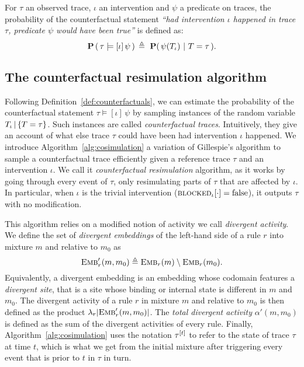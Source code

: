 \begin{definition}\label{def:counterfactuals}
  For $\tau$ an observed trace, $\iota$ an intervention and $\psi$ a
  predicate on traces, the probability of the counterfactual statement
  \textit{``had intervention $\iota$ happened in trace $\tau$,
    predicate $\psi$ would have been true''} is defined as:
  \[ \PCFST{} \eqdef \ \mathbf{P}(\, \psi(\ATRAJ{}) \ |\ T = \tau\,). \]
\end{definition}

\subsection{The counterfactual resimulation algorithm}
\label{subsec:cosim-algo}

Following Definition~\ref{def:counterfactuals}, we can estimate the
probability of the counterfactual statement
$\tau \models [\iota] \, \psi$ by sampling instances of the random
variable ${T_\iota\,|\,\{T=\tau\}}{}$. Such instances are called \emph{counterfactual
  traces}. Intuitively, they give an account of what else trace
$\tau$ could have been had intervention $\iota$ happened.  We
introduce Algorithm~\ref{alg:cosimulation} a variation of Gillespie's
algorithm to sample a counterfactual trace efficiently given a
reference trace $\tau$ and an intervention $\iota$.  We call it
\emph{counterfactual resimulation} algorithm, as it works by going
through every event of $\tau$, only resimulating parts of $\tau$ that are
affected by $\iota$. In particular, when $\iota$ is the trivial
intervention (${\textsc{blocked}}_{\iota}[\cdot] = \text{false}$), it outputs
$\tau$ with no modification.

This algorithm relies on a modified notion of activity we call
\emph{divergent activity}. We define the set of \emph{divergent
  embeddings} of the left-hand side of a rule $r$ into mixture $m$
and relative to $m_0$ as
\[{\textsc{Emb}}'_{r}(m, m_0) \triangleq {\textsc{Emb}}_{r}(m) \setminus {\textsc{Emb}}_{r}(m_0).\]
Equivalently, a divergent embedding is an embedding whose codomain
features a \emph{divergent site}, that is a site whose binding or
internal state is different in $m$ and $m_0$. The {divergent activity}
of a rule $r$ in mixture $m$ and relative to $m_0$ is then defined as
the product $\lambda_r|{\textsc{Emb}}'_{r}(m, m_0)|$. The \emph{total divergent
  activity} $\alpha'(m, m_0)$ is defined as
the sum of the divergent activities of every rule. Finally,
Algorithm~\ref{alg:cosimulation} uses the notation $\tau^{[t]}$
to refer to the state of trace $\tau$ at time $t$, which is what we
get from the initial mixture after triggering every event that is
prior to $t$ in $\tau$ in turn.

